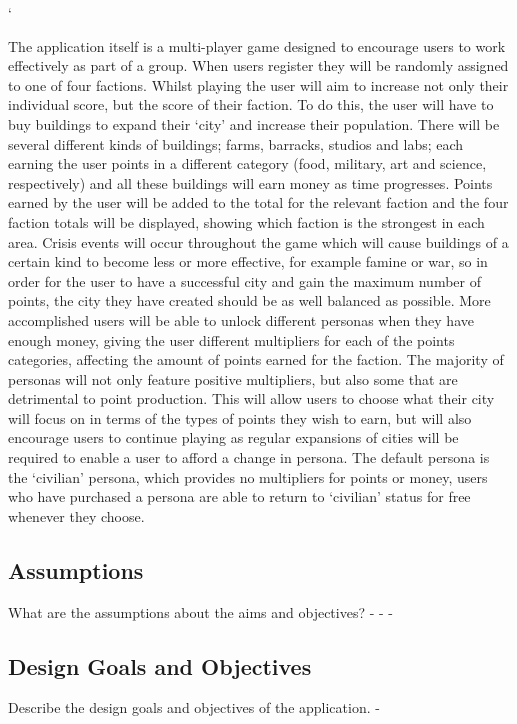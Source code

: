 `\documentclass{sig-alt-release2}
\begin{document}
The application itself is a multi-player game designed to encourage users to work effectively as part of a group. When users register they will be randomly assigned to one of four factions. Whilst playing the user will aim to increase not only their individual score, but the score of their faction. To do this, the user will have to buy buildings to expand their `city' and increase their population. There will be several different kinds of buildings; farms, barracks, studios and labs; each earning the user points in a different category (food, military, art and science, respectively) and all these buildings will earn money as time progresses. Points earned by the user will be added to the total for the relevant faction and the four faction totals will be displayed, showing which faction is the strongest in each area. Crisis events will occur throughout the game which will cause buildings of a certain kind to become less or more effective, for example famine or war, so in order for the user to have a successful city and gain the maximum number of points, the city they have created should be as well balanced as possible. More accomplished users will be able to unlock different personas when they have enough money, giving the user different multipliers for each of the points categories, affecting the amount of points earned for the faction. The majority of personas will not only feature positive multipliers, but also some that are detrimental to point production. This will allow users to choose what their city will focus on in terms of the types of points they wish to earn, but will also encourage users to continue playing as regular expansions of cities will be required to enable a user to afford a change in persona. The default persona is the `civilian' persona, which provides no multipliers for points or money, users who have purchased a persona are able to return to `civilian' status for free whenever they choose.

\subsection{Assumptions}

What are the assumptions about the aims and objectives?
-
- 
-


\subsection{Design Goals and Objectives} 

Describe the design goals and objectives of the application.
-
\end{document}
